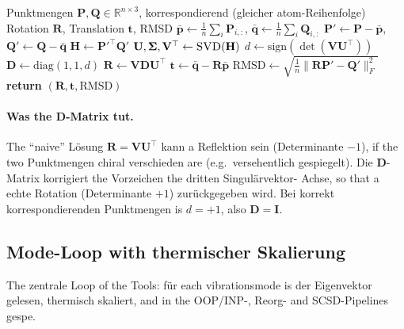 \documentclass[11pt,a4paper,twoside]{article}
\theoremstyle{remark}
\begin{document}
\begin{algorithm}[H]
\caption{\textsc{KabschAlign}}
\begin{algorithmic}[1]
\Require Punktmengen $\mathbf{P}, \mathbf{Q} \in \mathbb{R}^{n\times 3}$,
         korrespondierend (gleicher atom-Reihenfolge)
\Ensure Rotation $\mathbf{R}$, Translation $\mathbf{t}$, RMSD
\State $\bar{\mathbf{p}} \gets \frac{1}{n}\sum_i \mathbf{P}_{i,:}$,
       $\bar{\mathbf{q}} \gets \frac{1}{n}\sum_i \mathbf{Q}_{i,:}$
\State $\mathbf{P}' \gets \mathbf{P} - \bar{\mathbf{p}}$,
       $\mathbf{Q}' \gets \mathbf{Q} - \bar{\mathbf{q}}$
\State $\mathbf{H} \gets \mathbf{P}'^\top \mathbf{Q}'$
\State $\mathbf{U}, \boldsymbol{\Sigma}, \mathbf{V}^\top \gets
       \textsc{SVD}(\mathbf{H})$
\State $d \gets \text{sign}(\det(\mathbf{V} \mathbf{U}^\top))$
\State $\mathbf{D} \gets \text{diag}(1, 1, d)$
\State $\mathbf{R} \gets \mathbf{V} \mathbf{D} \mathbf{U}^\top$
\State $\mathbf{t} \gets \bar{\mathbf{q}} - \mathbf{R} \bar{\mathbf{p}}$
\State $\text{RMSD} \gets \sqrt{\frac{1}{n} \|\mathbf{R}\mathbf{P}' -
       \mathbf{Q}'\|_F^2}$
\State \textbf{return} $(\mathbf{R}, \mathbf{t}, \text{RMSD})$
\end{algorithmic}
\end{algorithm}

\paragraph{Was the $\mathbf{D}$-Matrix tut.}
The "`naive"' L\"osung $\mathbf{R} = \mathbf{V}\mathbf{U}^\top$ kann
a Reflektion sein (Determinante $-1$), if the two Punktmengen
chiral verschieden are (e.g.\ versehentlich gespiegelt). Die
$\mathbf{D}$-Matrix korrigiert the Vorzeichen the dritten Singul\"arvektor-
Achse, so that a echte Rotation (Determinante $+1$) zur\"uckgegeben
wird. Bei korrekt korrespondierenden Punktmengen is $d = +1$, also
$\mathbf{D} = \mathbf{I}$.

\subsection{Mode-Loop with thermischer Skalierung}
\label{app:pseudo-mode-loop}

The zentrale Loop of the Tools: f\"ur each vibrationsmode is der
Eigenvektor gelesen, thermisch skaliert, and in the OOP/INP-,
Reorg- and SCSD-Pipelines gespe.
\end{document}
